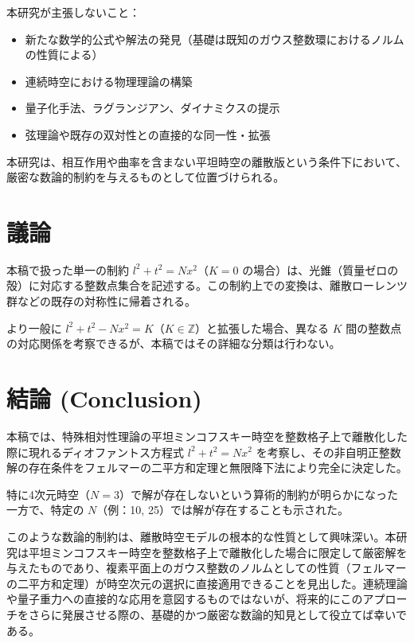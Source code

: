 \documentclass[a4paper,11pt]{ltjsarticle}
\begin{document}
本研究が主張しないこと：
\begin{itemize}
    \item 新たな数学的公式や解法の発見（基礎は既知のガウス整数環におけるノルムの性質による）
    \item 連続時空における物理理論の構築
    \item 量子化手法、ラグランジアン、ダイナミクスの提示
    \item 弦理論や既存の双対性との直接的な同一性・拡張
\end{itemize}

本研究は、相互作用や曲率を含まない平坦時空の離散版という条件下において、厳密な数論的制約を与えるものとして位置づけられる。

\section{議論}
本稿で扱った単一の制約 \(l^2 + t^2 = N x^2\)（\(K=0\) の場合）は、光錐（質量ゼロの殻）に対応する整数点集合を記述する。この制約上での変換は、離散ローレンツ群などの既存の対称性に帰着される。

より一般に \(l^2 + t^2 - N x^2 = K\)（\(K \in \mathbb{Z}\)）と拡張した場合、異なる \(K\) 間の整数点の対応関係を考察できるが、本稿ではその詳細な分類は行わない。

\section{結論 (Conclusion)}
本稿では、特殊相対性理論の平坦ミンコフスキー時空を整数格子上で離散化した際に現れるディオファントス方程式 \(l^2 + t^2 = N x^2\) を考察し、その非自明正整数解の存在条件をフェルマーの二平方和定理と無限降下法により完全に決定した。

特に4次元時空（\(N=3\)）で解が存在しないという算術的制約が明らかになった一方で、特定の \(N\)（例：10, 25）では解が存在することも示された。

このような数論的制約は、離散時空モデルの根本的な性質として興味深い。本研究は平坦ミンコフスキー時空を整数格子上で離散化した場合に限定して厳密解を与えたものであり、複素平面上のガウス整数のノルムとしての性質（フェルマーの二平方和定理）が時空次元の選択に直接適用できることを見出した。連続理論や量子重力への直接的な応用を意図するものではないが、将来的にこのアプローチをさらに発展させる際の、基礎的かつ厳密な数論的知見として役立てば幸いである。
\end{document}
